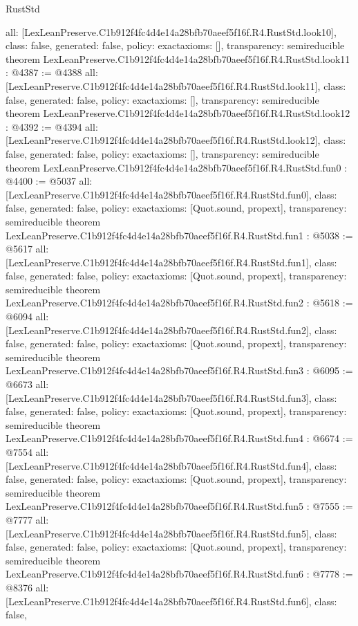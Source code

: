 \begin{lexlean}{RustStd}
\begin{coremodule}
{  all: [LexLeanPreserve.C1b912f4fc4d4e14a28bfb70aeef5f16f.R4.RustStd.look10],
  class: false,
  generated: false,
  policy: exact{axioms: []},
  transparency: semireducible
}
theorem LexLeanPreserve.C1b912f4fc4d4e14a28bfb70aeef5f16f.R4.RustStd.look11 : @4387 := @4388 {
  all: [LexLeanPreserve.C1b912f4fc4d4e14a28bfb70aeef5f16f.R4.RustStd.look11],
  class: false,
  generated: false,
  policy: exact{axioms: []},
  transparency: semireducible
}
theorem LexLeanPreserve.C1b912f4fc4d4e14a28bfb70aeef5f16f.R4.RustStd.look12 : @4392 := @4394 {
  all: [LexLeanPreserve.C1b912f4fc4d4e14a28bfb70aeef5f16f.R4.RustStd.look12],
  class: false,
  generated: false,
  policy: exact{axioms: []},
  transparency: semireducible
}
theorem LexLeanPreserve.C1b912f4fc4d4e14a28bfb70aeef5f16f.R4.RustStd.fun0 : @4400 := @5037 {
  all: [LexLeanPreserve.C1b912f4fc4d4e14a28bfb70aeef5f16f.R4.RustStd.fun0],
  class: false,
  generated: false,
  policy: exact{axioms: [Quot.sound, propext]},
  transparency: semireducible
}
theorem LexLeanPreserve.C1b912f4fc4d4e14a28bfb70aeef5f16f.R4.RustStd.fun1 : @5038 := @5617 {
  all: [LexLeanPreserve.C1b912f4fc4d4e14a28bfb70aeef5f16f.R4.RustStd.fun1],
  class: false,
  generated: false,
  policy: exact{axioms: [Quot.sound, propext]},
  transparency: semireducible
}
theorem LexLeanPreserve.C1b912f4fc4d4e14a28bfb70aeef5f16f.R4.RustStd.fun2 : @5618 := @6094 {
  all: [LexLeanPreserve.C1b912f4fc4d4e14a28bfb70aeef5f16f.R4.RustStd.fun2],
  class: false,
  generated: false,
  policy: exact{axioms: [Quot.sound, propext]},
  transparency: semireducible
}
theorem LexLeanPreserve.C1b912f4fc4d4e14a28bfb70aeef5f16f.R4.RustStd.fun3 : @6095 := @6673 {
  all: [LexLeanPreserve.C1b912f4fc4d4e14a28bfb70aeef5f16f.R4.RustStd.fun3],
  class: false,
  generated: false,
  policy: exact{axioms: [Quot.sound, propext]},
  transparency: semireducible
}
theorem LexLeanPreserve.C1b912f4fc4d4e14a28bfb70aeef5f16f.R4.RustStd.fun4 : @6674 := @7554 {
  all: [LexLeanPreserve.C1b912f4fc4d4e14a28bfb70aeef5f16f.R4.RustStd.fun4],
  class: false,
  generated: false,
  policy: exact{axioms: [Quot.sound, propext]},
  transparency: semireducible
}
theorem LexLeanPreserve.C1b912f4fc4d4e14a28bfb70aeef5f16f.R4.RustStd.fun5 : @7555 := @7777 {
  all: [LexLeanPreserve.C1b912f4fc4d4e14a28bfb70aeef5f16f.R4.RustStd.fun5],
  class: false,
  generated: false,
  policy: exact{axioms: [Quot.sound, propext]},
  transparency: semireducible
}
theorem LexLeanPreserve.C1b912f4fc4d4e14a28bfb70aeef5f16f.R4.RustStd.fun6 : @7778 := @8376 {
  all: [LexLeanPreserve.C1b912f4fc4d4e14a28bfb70aeef5f16f.R4.RustStd.fun6],
  class: false,
}
\end{coremodule}
\end{lexlean}
